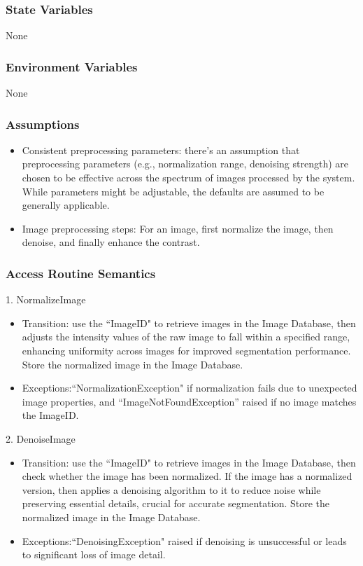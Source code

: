 \documentclass[12pt, titlepage]{article}
\begin{document}
\begin{itemize}
\subsubsection{State Variables}

None

\subsubsection{Environment Variables}

None


\subsubsection{Assumptions}

\begin{itemize}
    \item Consistent preprocessing parameters: there's an assumption that preprocessing parameters (e.g., normalization range, denoising strength) are chosen to be effective across the spectrum of images processed by the system. While parameters might be adjustable, the defaults are assumed to be generally applicable.

    \item Image preprocessing steps: For an image, first normalize the image, then denoise, and finally enhance the contrast.
\end{itemize}

\subsubsection{Access Routine Semantics}
1. NormalizeImage
\begin{itemize}
    \item Transition: use the ``ImageID" to retrieve images in the Image Database, then adjusts the intensity values of the raw image to fall within a specified range, enhancing uniformity across images for improved segmentation performance. Store the normalized image in the Image Database.
    \item Exceptions:``NormalizationException" if normalization fails due to unexpected image properties, and ``ImageNotFoundException” raised if no image matches the ImageID.
\end{itemize}

2. DenoiseImage
\begin{itemize}
    \item Transition: use the ``ImageID" to retrieve images in the Image Database, then check whether the image has been normalized. If the image has a normalized version, then applies a denoising algorithm to it to reduce noise while preserving essential details, crucial for accurate segmentation. Store the normalized image in the Image Database.
    \item Exceptions:``DenoisingException" raised if denoising is unsuccessful or leads to significant loss of image detail.
\end{itemize}


\end{itemize}
\end{document}
